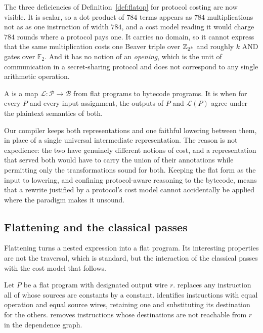 The three deficiencies of Definition~\ref{def:flatop} for protocol costing are now
visible. It is scalar, so a dot product of $784$ terms appears as $784$
multiplications not as as one instruction of width $784$, and a cost model
reading it would charge $784$ rounds where a protocol pays one. It carries no
domain, so it cannot express that the same multiplication costs one Beaver triple
over $\mathbb{Z}_{2^k}$ and roughly $k$ AND gates over $\mathbb{F}_2$. And it has no
notion of an \emph{opening}, which is the unit of communication in a
secret-sharing protocol and does not correspond to any single arithmetic
operation.

\begin{definition}
\label{def:lowering}
A  is a map $\mathcal{L} : \mathcal{P} \to \mathcal{B}$ from flat
programs to bytecode programs. It is  when for every $P$ and every
input assignment, the outputs of $P$ and $\mathcal{L}(P)$ agree under the
plaintext semantics of both.
\end{definition}

Our compiler keeps both representations and one faithful lowering between them,
in place of a single universal intermediate representation. The reason is not
expedience: the two have genuinely different notions of cost, and a
representation that served both would have to carry the union of their
annotations while permitting only the transformations sound for both. Keeping the
flat form as the input to lowering, and confining protocol-aware reasoning to the
bytecode, means that a rewrite justified by a protocol's cost model cannot
accidentally be applied where the paradigm makes it unsound.

\subsection{Flattening and the classical passes}
\label{sec:compiler:flatten}

Flattening turns a nested expression into a flat program. Its interesting
properties are not the traversal, which is standard, but the interaction of the
classical passes with the cost model that follows.

\begin{definition}
\label{def:passes}
Let $P$ be a flat program with designated output wire $r$.
 replaces any instruction all of whose sources are constants
by a constant.  identifies instructions with
equal operation and equal source wires, retaining one and substituting its
destination for the others.  removes instructions whose
destinations are not reachable from $r$ in the dependence graph.
\end{definition}

